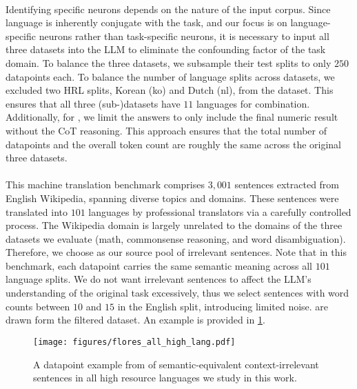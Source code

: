 \paragraph{\combined} \label{app:dataset:combined} Identifying specific neurons depends on the nature of the input corpus. Since language is inherently conjugate with the task, and our focus is on language-specific neurons rather than task-specific neurons, it is necessary to input all three datasets into the LLM to eliminate the confounding factor of the task domain. To balance the three datasets, we subsample their test splits to only $250$ datapoints each. To balance the number of language splits across datasets, we excluded two HRL splits, Korean (ko) and Dutch (nl), from the \xlwic dataset. This ensures that all three (sub-)datasets have $11$ languages for combination. Additionally, for \mgsm, we limit the answers to only include the final numeric result without the CoT reasoning. This approach ensures that the total number of datapoints and the overall token count are roughly the same across the original three datasets.


\paragraph{\flores} \label{app:dataset:flores} This machine translation benchmark comprises $3,001$ sentences extracted from English Wikipedia, spanning diverse topics and domains. These sentences were translated into $101$ languages by professional translators via a carefully controlled process. The Wikipedia domain is largely unrelated to the domains of the three datasets we evaluate (math, commonsense reasoning, and word disambiguation). Therefore, we choose \flores as our source pool of irrelevant sentences. Note that in this benchmark, each datapoint carries the same semantic meaning across all $101$ language splits. We do not want irrelevant sentences to affect the LLM's understanding of the original task excessively, thus we select sentences with word counts between $10$ and $15$ in the English split, introducing limited noise. \cis are drawn form the filtered \flores dataset. An example is provided in \cref{fig:flores}.

\begin{figure}[!t]
    \centering
    \texttt{[image: figures/flores\_all\_high\_lang.pdf]}
    \captionsetup{skip=1pt}
    \caption{A datapoint example from \flores of semantic-equivalent context-irrelevant sentences in all high resource languages we study in this work.}
    \label{fig:flores}
\end{figure}




